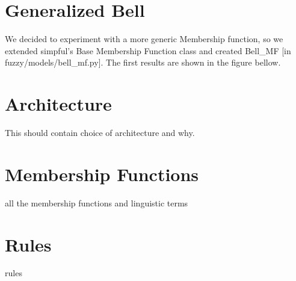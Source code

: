 \documentclass[11pt]{report}
\begin{document}
\section{Generalized Bell}
We decided to experiment with a more generic Membership function, so we
extended simpful's Base Membership Function class and created Bell\_MF [in fuzzy/models/bell\_mf.py].
The first results are shown in the figure bellow.


\section{Architecture}
This should contain choice of architecture and why.

\section{Membership Functions}
all the membership functions and linguistic terms

\begin{figure}

\end{figure}

\section{Rules}
rules
\end{document}
